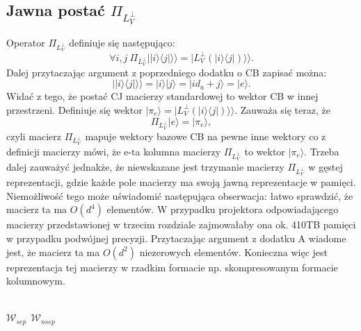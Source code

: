 \documentclass[10pt]{article} %
\newcommand{\Ket}[1]{|#1\rangle}
\newcommand{\Bra}[1]{\langle#1|}
\newcommand{\KKet}[1]{|#1\rangle\rangle}
\newcommand{\LPV}{{L^\perp_V}}
\begin{document}
\begin{appendices}
\section{Jawna postać $\Pi_\LPV$}
Operator $\Pi_\LPV$ definiuje się następująco:
\begin{equation}
\forall i,j~\Pi_\LPV \KKet{\Ket{i}\Bra{j}} = \KKet{\LPV(\Ket{i}\Bra{j})}.
\end{equation}
Dalej przytaczając argument z poprzedniego dodatku o CB zapisać można:
\begin{equation}
\KKet{\Ket{i}\Bra{j}} = \Ket{i}\Ket{j} = \Ket{i d_a + j} = \Ket{e}.
\end{equation} Widać z tego, że postać CJ macierzy standardowej to wektor CB w innej przestrzeni.
Definiuje się wektor $\Ket{\pi_{e}} = \KKet{\LPV(\Ket{i}\Bra{j})}$. Zauważa się teraz, że 
\begin{equation}
\Pi_\LPV \Ket{e} = \Ket{\pi_{e}},
\end{equation} czyli macierz $\Pi_\LPV$ mapuje wektory bazowe CB na pewne inne wektory co z definicji macierzy mówi, że e-ta kolumna macierzy $\Pi_\LPV$ to wektor $\Ket{\pi_{e}}$.
Trzeba dalej zauważyć jednakże, że niewskazane jest trzymanie macierzy $\Pi_\LPV$ w gęstej reprezentacji, gdzie każde pole macierzy ma swoją jawną reprezentacje w pamięci.
Niemożliwość tego może uświadomić następująca obserwacja: łatwo sprawdzić, że macierz ta ma $O(d^4)$ elementów. W przypadku projektora odpowiadającego macierzy przedstawionej w trzecim rozdziale zajmowałaby ona ok. 410TB pamięci w przypadku podwójnej precyzji.
Przytaczając argument z dodatku A wiadome jest, że macierz ta ma $O(d^2)$ niezerowych elementów. Konieczna więc jest reprezentacja tej macierzy w rzadkim formacie np. skompresowanym formacie kolumnowym.
\end{appendices}
\\
$\mathcal{W}_{sep}~~\mathcal{W}_{nsep}$
\end{document}
